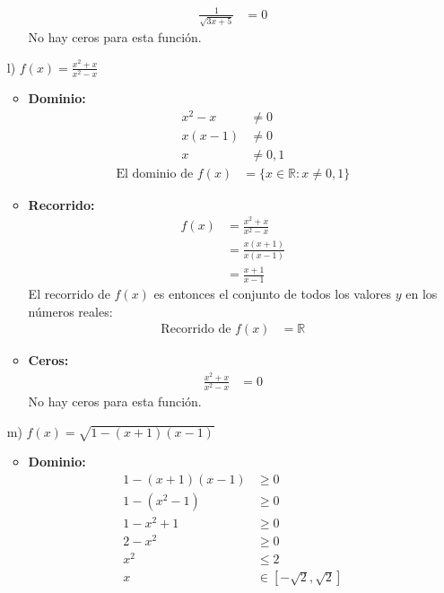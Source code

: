 \documentclass{templateNote}
\begin{document}
\begin{itemize}
\begin{itemize}
\begin{align*}
            \frac{1}{\sqrt{3x + 5}} &= 0
        \end{align*}
        No hay ceros para esta función.
    \end{itemize}
    \item[l)] $f(x) = \frac{x^2 + x}{x^2 - x}$
    \begin{itemize}
        \item \textbf{Dominio:}
        \begin{align*}
            x^2 - x &\neq 0 \\
            x(x - 1) &\neq 0 \\
            x &\neq 0, 1
        \end{align*}
        \begin{align*}
            \text{El dominio de } f(x) &= \{x \in \mathbb{R} : x \neq 0, 1\}
        \end{align*}
        \item \textbf{Recorrido:}
        \begin{align*}
            f(x) &= \frac{x^2 + x}{x^2 - x} \\
            &= \frac{x(x + 1)}{x(x - 1)} \\
            &= \frac{x + 1}{x - 1}
        \end{align*}
        El recorrido de \( f(x) \) es entonces el conjunto de todos los valores \( y \) en los números reales:
        \begin{align*}
            \text{Recorrido de } f(x) &= \mathbb{R}
        \end{align*}
        \item \textbf{Ceros:}
        \begin{align*}
            \frac{x^2 + x}{x^2 - x} &= 0
        \end{align*}
        No hay ceros para esta función.
    \end{itemize}
    \item[m)] $f(x) = \sqrt{1 - (x + 1)(x - 1)}$
    \begin{itemize}
        \item \textbf{Dominio:}
        \begin{align*}
            1 - (x + 1)(x - 1) &\geq 0 \\
            1 - (x^2 - 1) &\geq 0 \\
            1 - x^2 + 1 &\geq 0 \\
            2 - x^2 &\geq 0 \\
            x^2 &\leq 2 \\
            x &\in [-\sqrt{2}, \sqrt{2}]

\end{align*}
\end{itemize}
\end{itemize}
\end{document}
